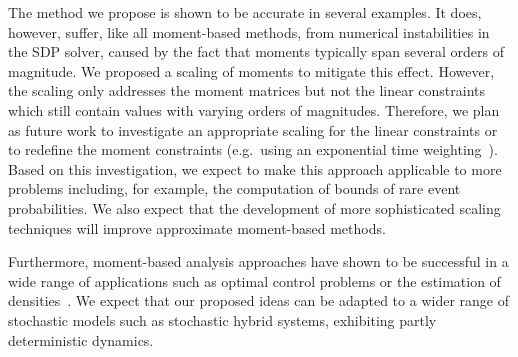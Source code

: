 The method we propose is shown to be accurate in several examples. It does, however, suffer, like all moment-based methods, from numerical instabilities in the \ac{SDP} solver, caused by the fact that moments typically span several orders of magnitude. We proposed a scaling of moments to mitigate this effect. 
However, the scaling only addresses the moment matrices but not the linear constraints
which still contain values with varying orders of magnitudes.
Therefore, we plan as future work to investigate an appropriate scaling for the linear constraints
or to redefine the moment
constraints (e.g.\ using an exponential time weighting~\cite{dowdy2018dynamic}).
Based on this investigation, we expect to make this approach applicable to
more problems including, for example, the computation of bounds of rare event probabilities.
We also expect that the development of more sophisticated scaling techniques will  improve approximate moment-based methods.

Furthermore, moment-based analysis approaches have shown to be successful
in a wide range of applications such as optimal control problems or the estimation
of densities~\cite{lasserre2010moments}.
We expect that our proposed ideas   can be adapted to a wider range
of stochastic models such as stochastic hybrid systems, exhibiting partly deterministic dynamics.

